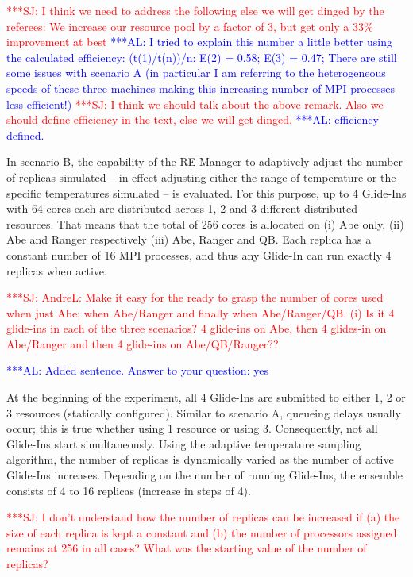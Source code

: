 \documentclass{rspublic}
\newcommand{\alnote}[1]{ {\textcolor{blue} { ***AL: #1 }}}
\newcommand{\jhanote}[1]{ {\textcolor{red} { ***SJ: #1 }}}
\newcommand{\alnote}[1]{}
\newcommand{\jhanote}[1]{}
\begin{document}
\jhanote{I think we need to address
  the following else we will get dinged by the referees: We increase
  our resource pool by a factor of 3, but get only a 33\% improvement
  at best} \alnote{I tried to explain this number a little better
  using the calculated efficiency: (t(1)/t(n))/n: E(2) = 0.58; E(3) =
  0.47; There are still some issues with scenario A (in particular I
  am referring to the heterogeneous speeds of these three machines
  making this increasing number of MPI processes less efficient!)}
\jhanote{I think we should talk about the above remark. Also we should
  define efficiency in the text, else we will get dinged.}  
\alnote{efficiency defined.}

In scenario B, the capability of the RE-Manager to adaptively adjust
the number of replicas simulated -- in effect adjusting either the
range of temperature or the specific temperatures simulated -- is
evaluated. For this purpose, up to 4 Glide-Ins with 64 cores each are
distributed across 1, 2 and 3 different distributed resources. That
means that the total of 256 cores is allocated on (i) Abe only, (ii)
Abe and Ranger respectively (iii) Abe, Ranger and QB.  Each replica
has a constant number of 16 MPI processes, and thus any Glide-In can
run exactly 4 replicas when active.

\jhanote{AndreL: Make it easy for the ready to grasp the number of
  cores used when just Abe; when Abe/Ranger and finally when
  Abe/Ranger/QB. (i) Is it 4 glide-ins in each of the three scenarios?
  4 glide-ins on Abe, then 4 glides-in on Abe/Ranger and then 4
  glide-ins on Abe/QB/Ranger??}

\alnote{Added sentence. Answer to your question: yes}
              
At the beginning of the experiment, all 4 Glide-Ins are submitted to
either 1, 2 or 3 resources (statically configured).  Similar to
scenario A, queueing delays usually occur; this is true whether using
1 resource or using 3.  Consequently, not all Glide-Ins start
simultaneously.  Using the adaptive temperature sampling algorithm,
the number of replicas is dynamically varied as the number of active
Glide-Ins increases. Depending on the number of running Glide-Ins, the
ensemble consists of 4 to 16 replicas (increase in
steps of 4).

\jhanote{I don't understand how the number of replicas can be
  increased if (a) the size of each replica is kept a constant and (b)
  the number of processors assigned remains at 256 in all cases? What
  was the starting value of the number of replicas?}  
\end{document}
